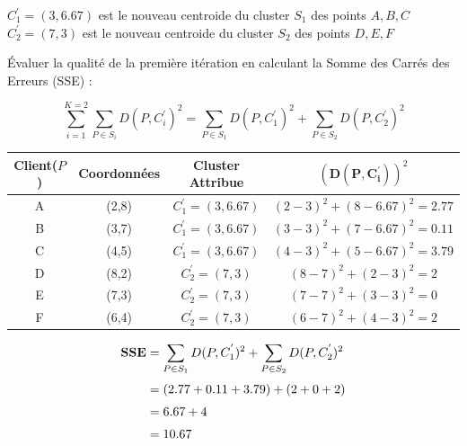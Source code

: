 \documentclass{article}
\begin{document}
\vspace{0.45cm}

$C^{'}_1 = (3,6.67)$ est le nouveau centroide du cluster $S_1$ des points $ A , B , C$ \\[0.15cm] 
$C^{'}_2 = (7,3)$ est le nouveau centroide du cluster $S_2$ des points $ D , E , F$ 

\newpage 

Évaluer la qualité de la première itération en calculant la Somme des Carrés des Erreurs (SSE) : 

\[\sum_{i=1}^{K=2} \sum_{P \in S_i } D(P,C^{'}_i)^2 = \sum_{P \in S_1 } D(P,C^{'}_1)^2 + \sum_{P \in S_2 } D(P,C^{'}_2)^2  \]


\begin{table}[h]
\centering


\renewcommand{\arraystretch}{2.25} 
\setlength{\tabcolsep}{3pt}      

\begin{tabular}{|c|c|c|c|} 
\hline
\textbf{Client($P$)} & \textbf{Coordonnées} & Cluster Attribue  & $(\mathbf{D(P,C^{'}_i)})^2$  \\ \hline
A        & (2,8)      & $C^{'}_1 = (3,6.67)$    &  $(2-3)^2 + (8-6.67)^2  = 2.77$     \\ \hline
B          & (3,7) & $C^{'}_1 = (3,6.67)$ &   $(3-3)^2 + (7-6.67)^2 = 0.11$     \\ \hline
C & (4,5)  & $C^{'}_1 = (3,6.67)$  & $ (4-3)^2 + (5-6.67)^2 = 3.79$      \\ \hline
D        & (8,2) & $C^{'}_2 = (7,3)$ &   $(8-7)^2 + (2-3)^2 = 2$    \\ \hline     
E          & (7,3) & $C^{'}_2 = (7,3)$  & $(7-7)^2 + (3-3)^2 = 0$ \\ \hline           
F      & (6,4) & $C^{'}_2 = (7,3)$  & $(6-7)^2 + (4-3)^2 = 2$   \\ \hline           

\end{tabular}
\end{table}

\begin{align*}
    \textbf{\text{SSE}} & = \sum_{P \in S_1 } D(P,C^{'}_1)^2 + \sum_{P \in S_2 } D(P,C^{'}_2)^2\\[0.1cm]
                        & = (2.77 + 0.11 + 3.79) + (2+0+2)\\[0.1cm]
                        & =  6.67 + 4\\[0.1cm]
                        & = 10.67
\end{align*}
\end{document}
